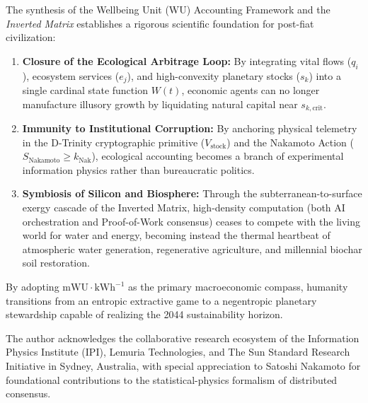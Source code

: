 \documentclass[aps,pre,twocolumn,10pt,superscriptaddress,amsmath,amssymb,amsfonts,floatfix,showkeys]{revtex4-2}
\begin{document}
The synthesis of the Wellbeing Unit ($\text{WU}$) Accounting Framework and the \textit{Inverted Matrix} establishes a rigorous scientific foundation for post-fiat civilization:
\begin{enumerate}
    \item \textbf{Closure of the Ecological Arbitrage Loop:} By integrating vital flows ($q_i$), ecosystem services ($e_j$), and high-convexity planetary stocks ($s_k$) into a single cardinal state function $W(t)$, economic agents can no longer manufacture illusory growth by liquidating natural capital near $s_{k,\text{crit}}$.
    \item \textbf{Immunity to Institutional Corruption:} By anchoring physical telemetry in the D-Trinity cryptographic primitive ($V_{\text{stock}}$) and the Nakamoto Action ($S_{\text{Nakamoto}} \ge k_{\text{Nak}}$), ecological accounting becomes a branch of experimental information physics rather than bureaucratic politics.
    \item \textbf{Symbiosis of Silicon and Biosphere:} Through the subterranean-to-surface exergy cascade of the Inverted Matrix, high-density computation (both AI orchestration and Proof-of-Work consensus) ceases to compete with the living world for water and energy, becoming instead the thermal heartbeat of atmospheric water generation, regenerative agriculture, and millennial biochar soil restoration.
\end{enumerate}

By adopting $\text{mWU}\cdot\text{kWh}^{-1}$ as the primary macroeconomic compass, humanity transitions from an entropic extractive game to a negentropic planetary stewardship capable of realizing the 2044 sustainability horizon.

\begin{acknowledgments}
The author acknowledges the collaborative research ecosystem of the Information Physics Institute (IPI), Lemuria Technologies, and The Sun Standard Research Initiative in Sydney, Australia, with special appreciation to Satoshi Nakamoto for foundational contributions to the statistical-physics formalism of distributed consensus.
\end{acknowledgments}
\end{document}
